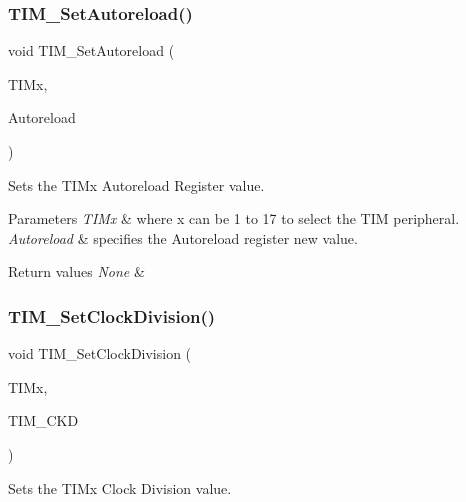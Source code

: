 \subsubsection{\texorpdfstring{TIM\_SetAutoreload()}{TIM\_SetAutoreload()}}
{\footnotesize\ttfamily void T\+I\+M\+\_\+\+Set\+Autoreload (\begin{DoxyParamCaption}\item[{\mbox{\hyperlink{struct_t_i_m___type_def}{T\+I\+M\+\_\+\+Type\+Def}} $\ast$}]{T\+I\+Mx,  }\item[{uint16\+\_\+t}]{Autoreload }\end{DoxyParamCaption})}



Sets the T\+I\+Mx Autoreload Register value. 


\begin{DoxyParams}{Parameters}
{\em T\+I\+Mx} & where x can be 1 to 17 to select the T\+IM peripheral. \\
\hline
{\em Autoreload} & specifies the Autoreload register new value. \\
\hline
\end{DoxyParams}

\begin{DoxyRetVals}{Return values}
{\em None} & \\
\hline
\end{DoxyRetVals}
\mbox{\label{group___t_i_m___exported___functions_ga20ef804dc32c723662d11ee7da3baab2}} 
\subsubsection{\texorpdfstring{TIM\_SetClockDivision()}{TIM\_SetClockDivision()}}
{\footnotesize\ttfamily void T\+I\+M\+\_\+\+Set\+Clock\+Division (\begin{DoxyParamCaption}\item[{\mbox{\hyperlink{struct_t_i_m___type_def}{T\+I\+M\+\_\+\+Type\+Def}} $\ast$}]{T\+I\+Mx,  }\item[{uint16\+\_\+t}]{T\+I\+M\+\_\+\+C\+KD }\end{DoxyParamCaption})}



Sets the T\+I\+Mx Clock Division value. 


